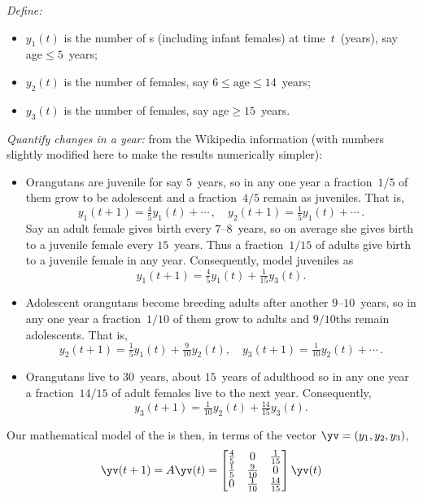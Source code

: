 \begin{example}[orangutans]
\begin{solution}
\emph{Define:}
\begin{itemize}
\item \(y_1(t)\) is the number of  s (including infant females) at time~\(t\)~(years), say age\({}\leq5\)~years;
\item \(y_2(t)\) is the number of  females, say \(6\leq\text{age}\leq 14\)~years;
\item \(y_3(t)\) is the number of  females, say age\({}\geq15\)~years.
\end{itemize}
\emph{Quantify changes in a year:} from the Wikipedia information (with numbers slightly modified here to make the results numerically simpler):
\begin{itemize}
\item Orangutans are juvenile for say \(5\)~years, so in any one year a fraction~\(1/5\) of them grow to be adolescent and a fraction~\(4/5\) remain as juveniles.
That is,
\begin{equation*}
y_1(t+1)=\tfrac45y_1(t)+\cdots\,,\quad y_2(t+1)=\tfrac15y_1(t)+\cdots\,.
\end{equation*}
Say an adult female gives birth every \(7\)--\(8\)~years, so on average she gives birth to a juvenile female every \(15\)~years. 
Thus a fraction~\(1/15\) of adults give birth to a juvenile female in any year.
Consequently, model juveniles as 
\begin{equation*}
{y_1}(t+1)=\tfrac45y_1(t)+\tfrac1{15}y_3(t).
\end{equation*}
\item Adolescent orangutans become breeding adults after another \(9\)--\(10\)~years, so in any one year a fraction~\(1/10\) of them grow to adults and \(9/10\)ths remain adolescents.
That is, 
\begin{equation*}
{y_2(t+1)}=\tfrac15y_1(t)+\tfrac9{10}y_2(t),\quad
{y_3(t+1)}=\tfrac1{10}y_2(t)+\cdots\,.
\end{equation*}

\item Orangutans live to 30~years, about \(15\)~years of adulthood so in any one year a fraction~\(14/15\) of adult females live to the next year.  
Consequently, 
\begin{equation*}
{y_3(t+1)}=\tfrac1{10}y_2(t)+\tfrac{14}{15}y_3(t).
\end{equation*}

\end{itemize}

Our mathematical model of the  is then, in terms of the vector \(\yv=(y_1,y_2,y_3)\),  
\begin{equation*}
\yv(t+1)=A\yv(t)
=\begin{bmatrix} \frac45&0&\frac1{15}
\\\frac15&\frac9{10}&0
\\0&\frac1{10}&\frac{14}{15} \end{bmatrix}\yv(t)
\end{equation*}


\end{solution}
\end{example}
